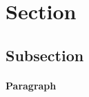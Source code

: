 \documentclass{article}
\begin{document}
\section{Section}
\subsection{Subsection}
\paragraph{Paragraph}



\end{document}
